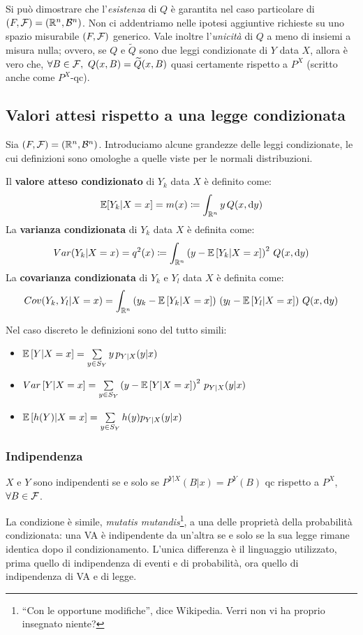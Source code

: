Si può dimostrare che l'\emph{esistenza} di $Q$ è garantita nel caso particolare di $(F, \mathcal F) = (\mathbb R^n, \mathcal B^n)$.
Non ci addentriamo nelle ipotesi aggiuntive richieste su uno spazio misurabile $(F, \mathcal F)$ generico.
Vale inoltre l'\emph{unicità} di $Q$ a meno di insiemi a misura nulla; ovvero, se $Q$ e $\widetilde{Q}$ sono due leggi condizionate di $Y$ data $X$, allora è vero che, $\forall B \in \mathcal F, \ Q(x, B) = \widetilde Q(x, B)$ quasi certamente rispetto a $P^X$ (scritto anche come $P^X$-qc).

\subsection{Valori attesi rispetto a una legge condizionata}

Sia $(F, \mathcal F) = (\mathbb R^n, \mathcal B^n)$.
Introduciamo alcune grandezze delle leggi condizionate, le cui definizioni sono omologhe a quelle viste per le normali distribuzioni.
\begin{defn}
  Il \textbf{valore atteso condizionato} di $Y_k$ data $X$ è definito come:
    $$\mathbb E[Y_k|X=x] = m(x) \coloneqq \int_{\mathbb R^n} y \, Q(x, \mathrm d y)$$
  La \textbf{varianza condizionata} di $Y_k$ data $X$ è definita come:
    $$Var(Y_k|X=x) = q^2(x) \coloneqq \int_{\mathbb R^n} \left(y - \mathbb E \left[Y_k|X=x \right] \right)^2 \, Q(x, \mathrm d y)$$
  La \textbf{covarianza condizionata} di $Y_k$ e $Y_l$ data $X$ è definita come:
    $$Cov(Y_k, Y_l|X=x) = \int_{\mathbb R^n} \left(y_k - \mathbb E\left[Y_k|X=x\right]\right) \, \left(y_l - \mathbb E\left[Y_l|X=x\right]\right) \, Q(x, \mathrm d y)$$
\end{defn}

Nel caso discreto le definizioni sono del tutto simili:
\begin{itemize}
  \item $\mathbb E\left[Y|X=x\right] = \sum\limits_{y \in S_Y} y \, p_{Y|X}(y|x)$
  \item $Var\left[Y|X=x\right] = \sum\limits_{y \in S_Y} \left(y - \mathbb E\left[Y|X=x\right]\right)^2 \, p_{Y|X}(y|x)$
  \item $\mathbb E\left[h(Y)|X=x\right] = \sum\limits_{y \in S_Y} h(y) p_{Y|X}(y|x)$
\end{itemize}

\subsubsection{Indipendenza}

\begin{prop}
  $X$ e $Y$ sono indipendenti se e solo se $P^{Y|X}(B|x) = P^{Y}(B)$ qc rispetto a $P^X$, $\forall B \in \mathcal F$.
\end{prop}
La condizione è simile, \emph{mutatis mutandis}\footnote{``Con le opportune modifiche'', dice Wikipedia. Verri non vi ha proprio insegnato niente?}, a una delle proprietà della probabilità condizionata: una VA è indipendente da un'altra se e solo se la sua legge rimane identica dopo il condizionamento. L'unica differenza è il linguaggio utilizzato, prima quello di indipendenza di eventi e di probabilità, ora quello di indipendenza di VA e di legge.
\medskip

